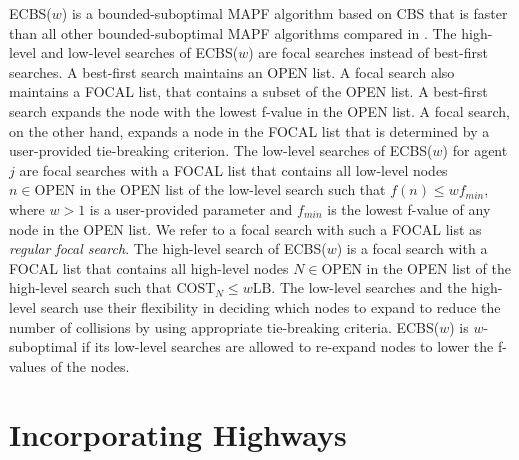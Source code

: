 \documentclass[letterpaper]{article}
\theoremstyle{definition}
\newcommand{\open}{\mbox{OPEN}\xspace}
\newcommand{\focal}{\mbox{FOCAL}\xspace}
\newcommand{\lb}{\mbox{LB}\xspace}
\newcommand{\costn}[1]{\ensuremath{\mbox{COST}_{#1}}}
\begin{document}
ECBS($w$) \cite{BSSF:SOCS:14} is a bounded-suboptimal MAPF algorithm based on
CBS that is faster than all other bounded-suboptimal MAPF algorithms compared
in \cite{BSSF:SOCS:14}. The high-level and low-level searches of ECBS($w$) are
focal searches \cite{PJ:IEEE:82} instead of best-first searches. A best-first
search maintains an \open list. A focal search also maintains a \focal list,
that contains a subset of the \open list. A best-first search expands the node
with the lowest f-value in the \open list. A focal search, on the other hand,
expands a node in the \focal list that is determined by a user-provided
tie-breaking criterion. The low-level searches of ECBS($w$) for agent $j$ are
focal searches with a \focal list that contains all low-level nodes $n \in
\open$ in the \open list of the low-level search such that $f(n) \leq w
f_{min}$, where $w > 1$ is a user-provided parameter and $f_{min}$ is the
lowest f-value of any node in the \open list. We refer to a focal search with
such a \focal list as \emph{regular focal search}. The high-level search of
ECBS($w$) is a focal search with a \focal list that contains all high-level
nodes $N \in \open$ in the \open list of the high-level search such that
$\costn N \leq w \lb$. The low-level searches and the high-level search use
their flexibility in deciding which nodes to expand to reduce the number of
collisions by using appropriate tie-breaking criteria. ECBS($w$) is
$w$-suboptimal if its low-level searches are allowed to re-expand nodes to
lower the f-values of the nodes.

\section{Incorporating Highways}
\end{document}
